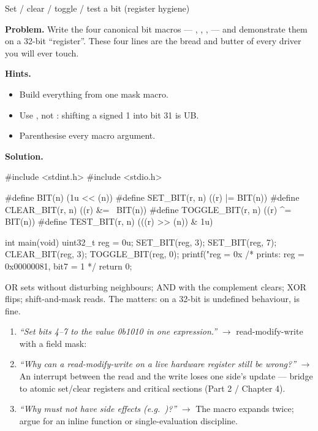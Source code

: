 \begin{gymproblem}{Set / clear / toggle / test a bit (register hygiene)}

\textbf{Problem.} Write the four canonical bit macros ---
, , ,  ---
and demonstrate them on a 32-bit ``register''. These four lines are the bread
and butter of every driver you will ever touch.

\textbf{Hints.}
\begin{itemize}
\item Build everything from one  mask macro.
\item Use , not : shifting a signed 1 into bit 31 is UB.
\item Parenthesise every macro argument.
\end{itemize}

\attempt

\textbf{Solution.}
\begin{cgym}
#include <stdint.h>
#include <stdio.h>

#define BIT(n)            (1u << (n))
#define SET_BIT(r, n)     ((r) |=  BIT(n))
#define CLEAR_BIT(r, n)   ((r) &= ~BIT(n))
#define TOGGLE_BIT(r, n)  ((r) ^=  BIT(n))
#define TEST_BIT(r, n)    (((r) >> (n)) & 1u)

int main(void) {
    uint32_t reg = 0u;
    SET_BIT(reg, 3);
    SET_BIT(reg, 7);
    CLEAR_BIT(reg, 3);
    TOGGLE_BIT(reg, 0);
    printf("reg = 0x%
    /* prints: reg = 0x00000081, bit7 = 1 */
    return 0;
}
\end{cgym}

OR sets without disturbing neighbours; AND with the complement clears; XOR
flips; shift-and-mask reads. The  matters:  on a
32-bit  is undefined behaviour,  is fine.

\followups
\begin{enumerate}
\item \emph{``Set bits 4--7 to the value 0b1010 in one expression.''}
  $\rightarrow$ read-modify-write with a field mask:
\item \emph{``Why can a read-modify-write on a live hardware register still
  be wrong?''} $\rightarrow$ An interrupt between the read and the write
  loses one side's update --- bridge to atomic set/clear registers and
  critical sections (Part 2 / Chapter 4).
\item \emph{``Why must  not have side effects
  (e.g.\ )?''} $\rightarrow$ The macro expands
   twice; argue for an inline function or single-evaluation
  discipline.
\end{enumerate}
\end{gymproblem}

